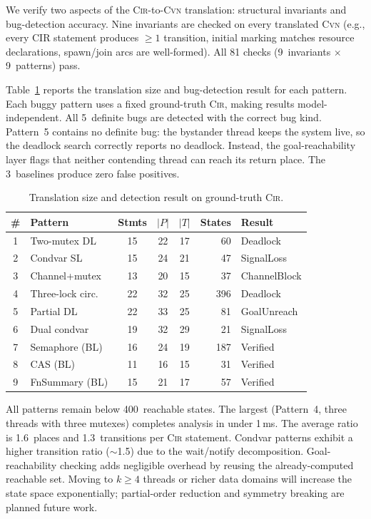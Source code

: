 \documentclass{article}
\begin{document}
We verify two aspects of the \textsc{Cir}-to-\textsc{Cvn} translation: structural invariants and bug-detection accuracy. Nine invariants are checked on every translated \textsc{Cvn} (e.g., every CIR statement produces $\geq 1$ transition, initial marking matches resource declarations, spawn/join arcs are well-formed). All 81 checks (9~invariants $\times$ 9~patterns) pass.

Table~\ref{tab:translation} reports the translation size and bug-detection result for each pattern. Each buggy pattern uses a fixed ground-truth \textsc{Cir}, making results model-independent. All 5~definite bugs are detected with the correct bug kind. Pattern~5 contains no definite bug: the bystander thread keeps the system live, so the deadlock search correctly reports no deadlock. Instead, the goal-reachability layer flags that neither contending thread can reach its return place.  The 3~baselines produce zero false positives.

\begin{table}[t]
\caption{Translation size and detection result on ground-truth \textsc{Cir}.}
\label{tab:translation}
\centering\footnotesize
\begin{tabular}{@{}clcccrl@{}}
\toprule
\textbf{\#} & \textbf{Pattern}
  & \textbf{Stmts} & $|P|$ & $|T|$
  & \textbf{States} & \textbf{Result} \\
\midrule
1  & Two-mutex DL       & 15 & 22 & 17 &  60  & Deadlock \\
2  & Condvar SL         & 15 & 24 & 21 &  47  & SignalLoss \\
3  & Channel+mutex      & 13 & 20 & 15 &  37  & ChannelBlock \\
4  & Three-lock circ.   & 22 & 32 & 25 & 396  & Deadlock \\
5  & Partial DL         & 22 & 33 & 25 &  81  & GoalUnreach \\
6  & Dual condvar       & 19 & 32 & 29 &  21  & SignalLoss \\
\midrule
7  & Semaphore (BL)     & 16 & 24 & 19 & 187  & Verified \\
8  & CAS (BL)           & 11 & 16 & 15 &  31  & Verified \\
9  & FnSummary (BL)     & 15 & 21 & 17 &  57  & Verified \\
\bottomrule
\end{tabular}
\end{table}

All patterns remain below 400~reachable states. The largest (Pattern~4, three threads with three mutexes) completes analysis in under 1\,ms.  The average ratio is 1.6~places and 1.3~transitions per \textsc{Cir} statement. Condvar patterns exhibit a higher transition ratio ($\sim$1.5) due to the wait/notify decomposition. Goal-reachability checking adds negligible overhead by reusing the already-computed reachable set. Moving to $k \geq 4$ threads or richer data domains will increase the state space exponentially; partial-order reduction and symmetry breaking are planned future work.
\end{document}
